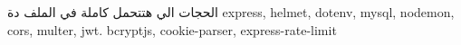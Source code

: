 الحجات الي هتتحمل كاملة في الملف دة 
{
express,
helmet,
dotenv,
mysql,
nodemon,
cors,
multer,
jwt.
bcryptjs,
cookie-parser,
express-rate-limit
}
